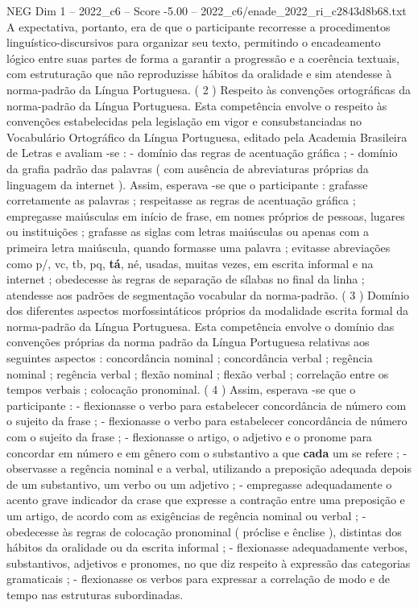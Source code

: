 \begin{textsample}{NEG Dim 1 – 2022\_c6 – Score -5.00 – 2022\_c6/enade\_2022\_ri\_c2843d8b68.txt}
A expectativa, portanto, era de que o participante recorresse a procedimentos linguístico-discursivos para organizar seu texto, permitindo o encadeamento lógico entre suas partes de forma a garantir a progressão e a coerência textuais, com estruturação que não reproduzisse hábitos da oralidade e sim atendesse à norma-padrão da Língua Portuguesa. ( 2 ) Respeito às convenções ortográficas da norma-padrão da Língua Portuguesa.
Esta competência envolve o respeito às convenções estabelecidas pela legislação em vigor e consubstanciadas no Vocabulário Ortográfico da Língua Portuguesa, editado pela Academia Brasileira de Letras e avaliam -se : - domínio das regras de acentuação gráfica ; - domínio da grafia padrão das palavras ( com ausência de abreviaturas próprias da linguagem da internet ).
Assim, esperava -se que o participante : grafasse corretamente as palavras ; respeitasse as regras de acentuação gráfica ; empregasse maiúsculas em início de frase, em nomes próprios de pessoas, lugares ou instituições ; grafasse as siglas com letras maiúsculas ou apenas com a primeira letra maiúscula, quando formasse uma palavra ; evitasse abreviações como p/, vc, tb, pq, \textbf{tá}, né, usadas, muitas vezes, em escrita informal e na internet ; obedecesse às regras de separação de sílabas no final da linha ; atendesse aos padrões de segmentação vocabular da norma-padrão. ( 3 ) Domínio dos diferentes aspectos morfossintáticos próprios da modalidade escrita formal da norma-padrão da Língua Portuguesa.
Esta competência envolve o domínio das convenções próprias da norma padrão da Língua Portuguesa relativas aos seguintes aspectos : concordância nominal ; concordância verbal ; regência nominal ; regência verbal ; flexão nominal ; flexão verbal ; correlação entre os tempos verbais ; colocação pronominal. ( 4 ) Assim, esperava -se que o participante : - flexionasse o verbo para estabelecer concordância de número com o sujeito da frase ; - flexionasse o verbo para estabelecer concordância de número com o sujeito da frase ; - flexionasse o artigo, o adjetivo e o pronome para concordar em número e em gênero com o substantivo a que \textbf{cada} um se refere ; - observasse a regência nominal e a verbal, utilizando a preposição adequada depois de um substantivo, um verbo ou um adjetivo ; - empregasse adequadamente o acento grave indicador da crase que expresse a contração entre uma preposição e um artigo, de acordo com as exigências de regência nominal ou verbal ; - obedecesse às regras de colocação pronominal ( próclise e ênclise ), distintas dos hábitos da oralidade ou da escrita informal ; - flexionasse adequadamente verbos, substantivos, adjetivos e pronomes, no que diz respeito à expressão das categorias gramaticais ; - flexionasse os verbos para expressar a correlação de modo e de tempo nas estruturas subordinadas.

\end{textsample}
